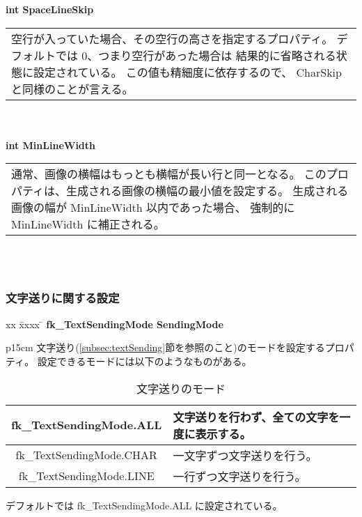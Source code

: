 \begin{tabbing}
\> \textbf{int SpaceLineSkip} \\
	\> \> \begin{tabular}{p{15cm}}
		空行が入っていた場合、その空行の高さを指定するプロパティ。
		デフォルトでは 0、つまり空行があった場合は
		結果的に省略される状態に設定されている。
		この値も精細度に依存するので、
		CharSkip と同様のことが言える。
	\end{tabular} \\ \\

\> \textbf{int MinLineWidth} \\
	\> \> \begin{tabular}{p{15cm}}
		通常、画像の横幅はもっとも横幅が長い行と同一となる。
		このプロパティは、生成される画像の横幅の最小値を設定する。
		生成される画像の幅が MinLineWidth 以内であった場合、
		強制的に MinLineWidth に補正される。
	\end{tabular} \\ \\
\end{tabbing}

\subsubsection{文字送りに関する設定} \label{subsubsec:sendRef}
\begin{tabbing}
xx \= xxxx \= \kill
\> \textbf{fk\_TextSendingMode SendingMode} \\
	\> \> \begin{tabular}{p{15cm}}
		文字送り(\ref{subsec:textSending}節を参照のこと)のモードを設定するプロパティ。
		設定できるモードには以下のようなものがある。
			\begin{table}[H]
			\caption{文字送りのモード}
			\label{tbl:textSending}
			\begin{center}
			\begin{tabular}{|c|l|}
			\hline
			fk\_TextSendingMode.ALL &
			文字送りを行わず、全ての文字を一度に表示する。\\ \hline
			fk\_TextSendingMode.CHAR &
			一文字ずつ文字送りを行う。\\ \hline
			fk\_TextSendingMode.LINE &
			一行ずつ文字送りを行う。\\ \hline
			\end{tabular}
			\end{center}
			\end{table}
		デフォルトでは fk\_TextSendingMode.ALL に設定されている。
	\end{tabular}
\end{tabbing}

